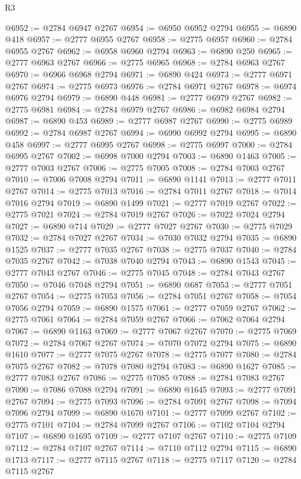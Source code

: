 \begin{lexlean}{R3}
\begin{coremodule}
@6952 := @2784 @6947 @2767
@6954 := @6950 @6952 @2794
@6955 := @6890 @418
@6957 := @2777 @6955 @2767
@6958 := @2775 @6957
@6960 := @2784 @6955 @2767
@6962 := @6958 @6960 @2794
@6963 := @6890 @250
@6965 := @2777 @6963 @2767
@6966 := @2775 @6965
@6968 := @2784 @6963 @2767
@6970 := @6966 @6968 @2794
@6971 := @6890 @424
@6973 := @2777 @6971 @2767
@6974 := @2775 @6973
@6976 := @2784 @6971 @2767
@6978 := @6974 @6976 @2794
@6979 := @6890 @448
@6981 := @2777 @6979 @2767
@6982 := @2775 @6981
@6984 := @2784 @6979 @2767
@6986 := @6982 @6984 @2794
@6987 := @6890 @453
@6989 := @2777 @6987 @2767
@6990 := @2775 @6989
@6992 := @2784 @6987 @2767
@6994 := @6990 @6992 @2794
@6995 := @6890 @458
@6997 := @2777 @6995 @2767
@6998 := @2775 @6997
@7000 := @2784 @6995 @2767
@7002 := @6998 @7000 @2794
@7003 := @6890 @1463
@7005 := @2777 @7003 @2767
@7006 := @2775 @7005
@7008 := @2784 @7003 @2767
@7010 := @7006 @7008 @2794
@7011 := @6890 @1141
@7013 := @2777 @7011 @2767
@7014 := @2775 @7013
@7016 := @2784 @7011 @2767
@7018 := @7014 @7016 @2794
@7019 := @6890 @1499
@7021 := @2777 @7019 @2767
@7022 := @2775 @7021
@7024 := @2784 @7019 @2767
@7026 := @7022 @7024 @2794
@7027 := @6890 @714
@7029 := @2777 @7027 @2767
@7030 := @2775 @7029
@7032 := @2784 @7027 @2767
@7034 := @7030 @7032 @2794
@7035 := @6890 @1525
@7037 := @2777 @7035 @2767
@7038 := @2775 @7037
@7040 := @2784 @7035 @2767
@7042 := @7038 @7040 @2794
@7043 := @6890 @1543
@7045 := @2777 @7043 @2767
@7046 := @2775 @7045
@7048 := @2784 @7043 @2767
@7050 := @7046 @7048 @2794
@7051 := @6890 @687
@7053 := @2777 @7051 @2767
@7054 := @2775 @7053
@7056 := @2784 @7051 @2767
@7058 := @7054 @7056 @2794
@7059 := @6890 @1575
@7061 := @2777 @7059 @2767
@7062 := @2775 @7061
@7064 := @2784 @7059 @2767
@7066 := @7062 @7064 @2794
@7067 := @6890 @1163
@7069 := @2777 @7067 @2767
@7070 := @2775 @7069
@7072 := @2784 @7067 @2767
@7074 := @7070 @7072 @2794
@7075 := @6890 @1610
@7077 := @2777 @7075 @2767
@7078 := @2775 @7077
@7080 := @2784 @7075 @2767
@7082 := @7078 @7080 @2794
@7083 := @6890 @1627
@7085 := @2777 @7083 @2767
@7086 := @2775 @7085
@7088 := @2784 @7083 @2767
@7090 := @7086 @7088 @2794
@7091 := @6890 @1645
@7093 := @2777 @7091 @2767
@7094 := @2775 @7093
@7096 := @2784 @7091 @2767
@7098 := @7094 @7096 @2794
@7099 := @6890 @1670
@7101 := @2777 @7099 @2767
@7102 := @2775 @7101
@7104 := @2784 @7099 @2767
@7106 := @7102 @7104 @2794
@7107 := @6890 @1695
@7109 := @2777 @7107 @2767
@7110 := @2775 @7109
@7112 := @2784 @7107 @2767
@7114 := @7110 @7112 @2794
@7115 := @6890 @1713
@7117 := @2777 @7115 @2767
@7118 := @2775 @7117
@7120 := @2784 @7115 @2767

\end{coremodule}
\end{lexlean}
